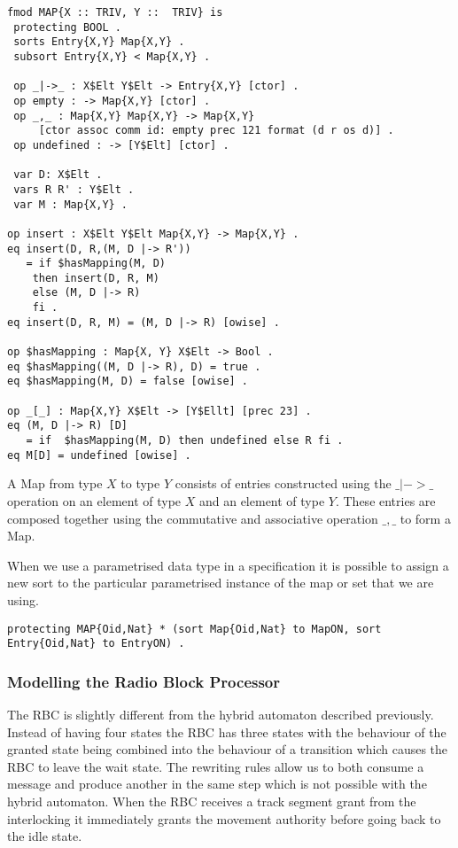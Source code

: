 \begin{lstlisting}[caption = The specification of the Map data type in Maude]
fmod MAP{X :: TRIV, Y ::  TRIV} is
 protecting BOOL .
 sorts Entry{X,Y} Map{X,Y} .
 subsort Entry{X,Y} < Map{X,Y} .

 op _|->_ : X$Elt Y$Elt -> Entry{X,Y} [ctor] .
 op empty : -> Map{X,Y} [ctor] .
 op _,_ : Map{X,Y} Map{X,Y} -> Map{X,Y} 
     [ctor assoc comm id: empty prec 121 format (d r os d)] .
 op undefined : -> [Y$Elt] [ctor] .

 var D: X$Elt .
 vars R R' : Y$Elt .
 var M : Map{X,Y} .

op insert : X$Elt Y$Elt Map{X,Y} -> Map{X,Y} .
eq insert(D, R,(M, D |-> R'))
   = if $hasMapping(M, D)
    then insert(D, R, M)
    else (M, D |-> R)
    fi .
eq insert(D, R, M) = (M, D |-> R) [owise] .

op $hasMapping : Map{X, Y} X$Elt -> Bool .
eq $hasMapping((M, D |-> R), D) = true .
eq $hasMapping(M, D) = false [owise] .

op _[_] : Map{X,Y} X$Elt -> [Y$Ellt] [prec 23] .
eq (M, D |-> R) [D]
   = if  $hasMapping(M, D) then undefined else R fi .
eq M[D] = undefined [owise] .
\end{lstlisting}
A Map from type $X$ to type $Y$ consists of entries constructed using the $\_|->\_$ operation on an element of type $X$ and an element of type $Y$. These entries are composed together using the commutative and associative operation $\_,\_$ to form a Map.  

When we use a parametrised data type in a specification it is possible to assign a new sort to the particular parametrised instance of the map or set that we are using.
\begin{center}
\texttt{protecting MAP\{Oid,Nat\}  * (sort Map\{Oid,Nat\} to MapON,
                               sort Entry\{Oid,Nat\} to EntryON) .}
\end{center}

\subsubsection*{Modelling the Radio Block Processor}
The RBC is slightly different from the hybrid automaton described previously. Instead of having four states the RBC has three states with the behaviour of the granted state being combined into the behaviour of a transition which causes the RBC to leave the wait state. The rewriting rules allow us to both consume a message and produce another in the same step which is not possible with the hybrid automaton.  When the RBC receives a track segment grant from the interlocking it immediately grants the movement authority before going back to the idle state.
 
